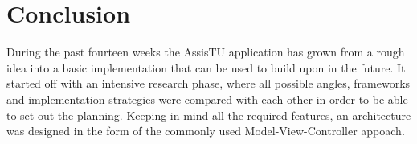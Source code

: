 \chapter{Conclusion}

During the past fourteen weeks the AssisTU application has grown from a rough idea into a basic implementation that can be used to build upon in the 
future. It started off with an intensive research phase, where all possible angles, frameworks and implementation strategies were compared with each
other in order to be able to set out the planning. Keeping in mind all the required features, an architecture was designed in the form of the 
commonly used Model-View-Controller appoach.